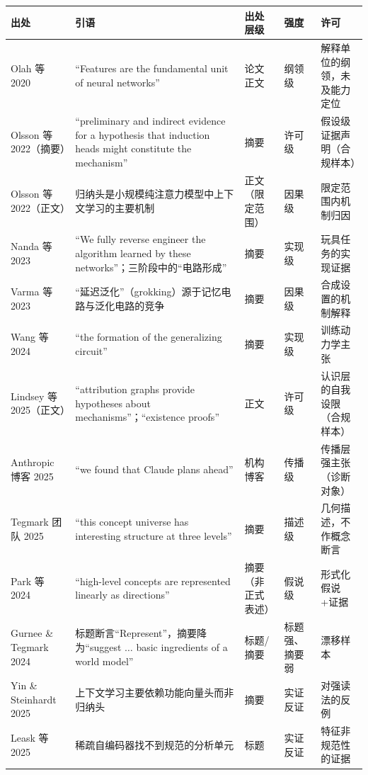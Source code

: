 \documentclass[10pt,fontset=fandol]{ctexart}
\begin{document}
\begin{longtable}{p{3.2cm} p{4.8cm} p{1.7cm} p{1.5cm} p{3.0cm}}
\toprule
出处 & 引语 & 出处层级 & 强度 & 许可 \\
\midrule
\endhead
Olah 等 2020\cite{olah2020zoomin} & ``Features are the fundamental unit of neural networks'' & 论文正文 & 纲领级 & 解释单位的纲领，未及能力定位 \\
Olsson 等 2022（摘要）\cite{olsson2022induction} & ``preliminary and indirect evidence for a hypothesis that induction heads might constitute the mechanism'' & 摘要 & 许可级 & 假设级证据声明（合规样本） \\
Olsson 等 2022（正文）\cite{olsson2022induction} & 归纳头是小规模纯注意力模型中上下文学习的主要机制 & 正文（限定范围） & 因果级 & 限定范围内机制归因 \\
Nanda 等 2023\cite{nanda2023progress} & ``We fully reverse engineer the algorithm learned by these networks''；三阶段中的“电路形成” & 摘要 & 实现级 & 玩具任务的实现证据 \\
Varma 等 2023\cite{varma2023circuit} & “延迟泛化”（grokking）源于记忆电路与泛化电路的竞争 & 摘要 & 因果级 & 合成设置的机制解释 \\
Wang 等 2024\cite{wang2024grokked} & ``the formation of the generalizing circuit'' & 摘要 & 实现级 & 训练动力学主张 \\
Lindsey 等 2025（正文）\cite{lindsey2025biology} & ``attribution graphs provide hypotheses about mechanisms''；``existence proofs'' & 正文 & 许可级 & 认识层的自我设限（合规样本） \\
Anthropic 博客 2025\cite{anthropic2025thoughts} & ``we found that Claude plans ahead'' & 机构博客 & 传播级 & 传播层强主张（诊断对象） \\
Tegmark 团队 2025\cite{tegmark2024geometry} & ``this concept universe has interesting structure at three levels'' & 摘要 & 描述级 & 几何描述，不作概念断言 \\
Park 等 2024\cite{park2024linear} & ``high-level concepts are represented linearly as directions'' & 摘要（非正式表述） & 假说级 & 形式化假说+证据 \\
Gurnee \& Tegmark 2024\cite{gurnee2024space} & 标题断言``Represent''，摘要降为``suggest $\ldots$ basic ingredients of a world model'' & 标题/摘要 & 标题强、摘要弱 & 漂移样本 \\
Yin \& Steinhardt 2025\cite{yin2025which} & 上下文学习主要依赖功能向量头而非归纳头 & 摘要 & 实证反证 & 对强读法的反例 \\
Leask 等 2025\cite{leask2025canonical} & 稀疏自编码器找不到规范的分析单元 & 标题 & 实证反证 & 特征非规范性的证据 \\
\bottomrule
\end{longtable}
\end{document}
